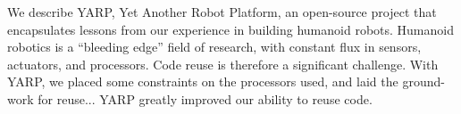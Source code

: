 
We describe YARP, Yet Another Robot Platform, an open-source project
that encapsulates lessons from our experience in building humanoid
robots.  Humanoid robotics is a ``bleeding edge'' field of 
research, with constant flux in sensors, actuators, and 
processors.  Code reuse is therefore a significant 
challenge.  With YARP, we placed some constraints on the 
processors used, and laid the ground-work for reuse...
%
YARP greatly improved our ability to 
reuse code.


